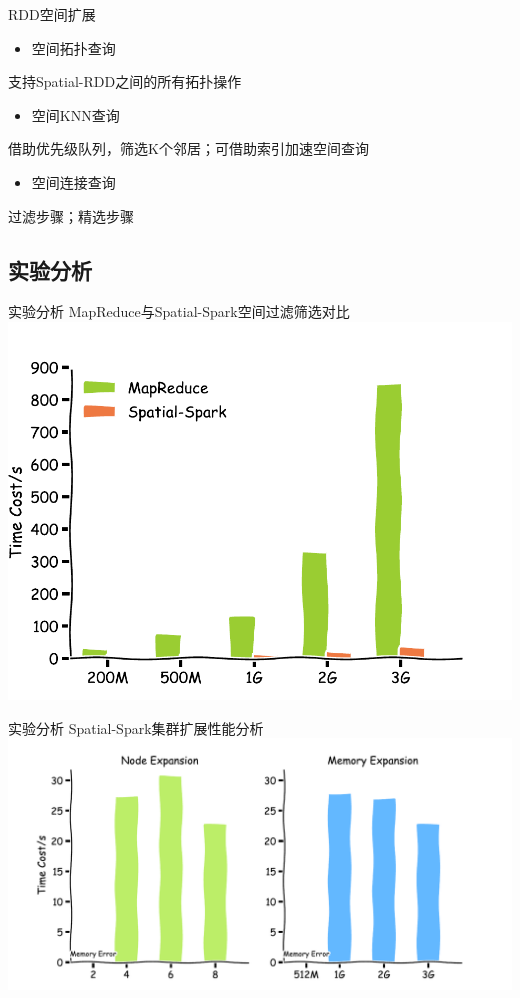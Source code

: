 \begin{frame}[c]{RDD空间扩展}
    \begin{itemize}
        \item \alert{空间拓扑查询}
    \end{itemize}
    支持Spatial-RDD之间的所有拓扑操作

    \pause
    \begin{itemize}
        \item \alert{空间KNN查询}
    \end{itemize}
    借助优先级队列，筛选K个邻居；可借助索引加速空间查询

    \pause
    \begin{itemize}
        \item \alert{空间连接查询}
    \end{itemize}
    过滤步骤；精选步骤
\end{frame}
\subsection{实验分析}

\begin{frame}[c]{实验分析}
    MapReduce与Spatial-Spark空间过滤筛选对比
    \vspace{1em}
    \includegraphics[scale=0.6]{figures/topo_query.pdf}
\end{frame}

\begin{frame}[c]{实验分析}
    Spatial-Spark集群扩展性能分析
    \vspace{1em}
    \includegraphics[scale=0.5]{figures/node_memory.pdf}
\end{frame}

